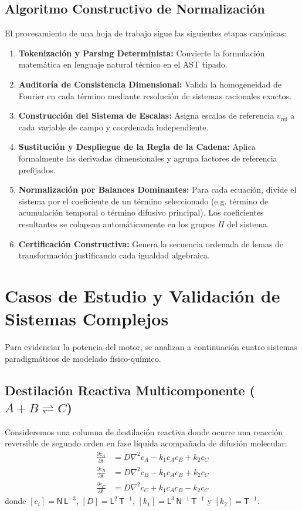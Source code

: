 \documentclass[11pt,a4paper]{article}
\theoremstyle{definition}
\theoremstyle{plain}
\theoremstyle{remark}
\newcommand{\refscale}[1]{#1_{\mathrm{ref}}}
\begin{document}
\subsection{Algoritmo Constructivo de Normalización}

El procesamiento de una hoja de trabajo sigue las siguientes etapas canónicas:
\begin{enumerate}
    \item \textbf{Tokenización y Parsing Determinista:} Convierte la formulación matemática en lenguaje natural técnico en el AST tipado.
    \item \textbf{Auditoría de Consistencia Dimensional:} Valida la homogeneidad de Fourier en cada término mediante resolución de sistemas racionales exactos.
    \item \textbf{Construcción del Sistema de Escalas:} Asigna escalas de referencia $\refscale{v}$ a cada variable de campo y coordenada independiente.
    \item \textbf{Sustitución y Despliegue de la Regla de la Cadena:} Aplica formalmente las derivadas dimensionales y agrupa factores de referencia prefijados.
    \item \textbf{Normalización por Balances Dominantes:} Para cada ecuación, divide el sistema por el coeficiente de un término seleccionado (e.g. término de acumulación temporal o término difusivo principal). Los coeficientes resultantes se colapsan automáticamente en los grupos $\Pi$ del sistema.
    \item \textbf{Certificación Constructiva:} Genera la secuencia ordenada de lemas de transformación justificando cada igualdad algebraica.
\end{enumerate}

\section{Casos de Estudio y Validación de Sistemas Complejos}

Para evidenciar la potencia del motor, se analizan a continuación cuatro sistemas paradigmáticos de modelado físico-químico.

\subsection{Destilación Reactiva Multicomponente ($A + B \rightleftharpoons C$)}

Consideremos una columna de destilación reactiva donde ocurre una reacción reversible de segundo orden en fase líquida acompañada de difusión molecular:
\begin{align}
    \frac{\partial c_A}{\partial t} &= D \nabla^2 c_A - k_1 c_A c_B + k_2 c_C \label{eq:destilacion_A} \\
    \frac{\partial c_B}{\partial t} &= D \nabla^2 c_B - k_1 c_A c_B + k_2 c_C \label{eq:destilacion_B} \\
    \frac{\partial c_C}{\partial t} &= D \nabla^2 c_C + k_1 c_A c_B - k_2 c_C \label{eq:destilacion_C}
\end{align}
donde $[c_i] = \mathsf{N}\,\mathsf{L}^{-3}$, $[D] = \mathsf{L}^2\,\mathsf{T}^{-1}$, $[k_1] = \mathsf{L}^3\,\mathsf{N}^{-1}\,\mathsf{T}^{-1}$ y $[k_2] = \mathsf{T}^{-1}$.
\end{document}
